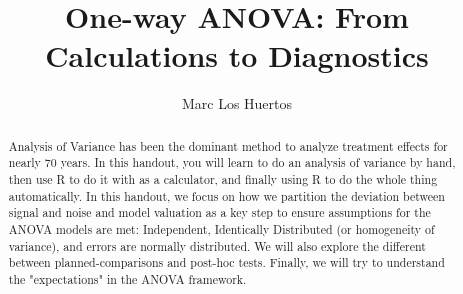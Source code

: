 \documentclass{tufte-handout}
\title{One-way ANOVA: From Calculations to Diagnostics %
}
\author[Marc Los Huertos]{Marc Los Huertos}
\date{}  %
\begin{document}
\maketitle%
\begin{abstract}
\noindent Analysis of Variance has been the dominant method to analyze treatment effects for nearly 70 years. In this handout, you will learn to do an analysis of variance by hand, then use R to do it with as a calculator, and finally using R to do the whole thing automatically. In this handout, we focus on how we partition the deviation between signal and noise and model valuation as a key step to ensure assumptions for the ANOVA models are met: Independent, Identically Distributed (or homogeneity of variance), and errors are normally distributed. We will also explore the different between planned-comparisons and post-hoc tests. Finally, we will try to understand the "expectations" in the ANOVA framework.  
\end{abstract}


\end{document}
